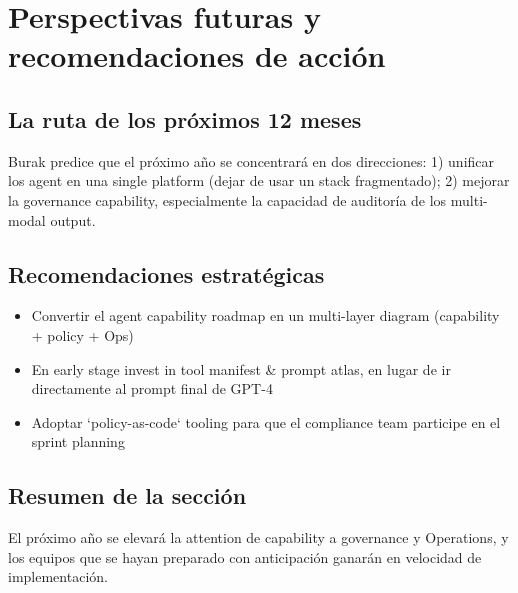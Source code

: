 \section{Perspectivas futuras y recomendaciones de acción}

\subsection{La ruta de los próximos 12 meses}

Burak predice que el próximo año se concentrará en dos direcciones: 1) unificar los agent en una single platform (dejar de usar un stack fragmentado); 2) mejorar la governance capability, especialmente la capacidad de auditoría de los multi-modal output.

\subsection{Recomendaciones estratégicas}

\begin{itemize}
    \item Convertir el agent capability roadmap en un multi-layer diagram (capability + policy + Ops)
    \item En early stage invest in tool manifest \& prompt atlas, en lugar de ir directamente al prompt final de GPT-4
    \item Adoptar `policy-as-code` tooling para que el compliance team participe en el sprint planning
\end{itemize}

\subsection{Resumen de la sección}

El próximo año se elevará la attention de capability a governance y Operations, y los equipos que se hayan preparado con anticipación ganarán en velocidad de implementación.

